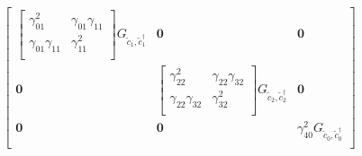 \[
\begin{bmatrix}
    \begin{bmatrix}
        \gamma_{01}^2           & \gamma_{01}\gamma_{11}                \\
        \gamma_{01}\gamma_{11}  & \gamma_{11}^2                         \\
    \end{bmatrix} G_{\tilde{c}_1, \tilde{c}^\dagger_1}   &   \mathbf{0}  &   \mathbf{0}            \\
    \mathbf{0}      & \begin{bmatrix}
                        \gamma_{22}^2           & \gamma_{22}\gamma_{32}\\
                        \gamma_{22}\gamma_{32}  & \gamma_{32}^2         \\
                      \end{bmatrix} G_{\tilde{c}_2, \tilde{c}^\dagger_2}  &   \mathbf{0}          \\
    \mathbf{0}      &   \mathbf{0}  &   \gamma_{40}^2           G_{\tilde{c}_0, \tilde{c}^\dagger_0}       \\
\end{bmatrix}
\]
